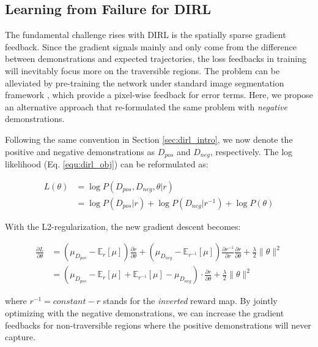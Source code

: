 \documentclass[../thesis.tex]{subfiles}
\begin{document}
\subsection{Learning from Failure for DIRL}
 
The fundamental challenge rises with DIRL is the spatially sparse gradient feedback.
Since the gradient signals mainly and only come from the difference between demonstrations and expected trajectories, the loss feedbacks in training will inevitably focus more on the traversible regions.
The problem can be alleviated by pre-training the network under standard image segmentation framework \cite{wulfmeier2016incorporating}, which provide a pixel-wise feedback for error terms.
Here, we propose an alternative approach that re-formulated the same problem with \textit{negative} demonstrations.
 
Following the same convention in Section \ref{sec:dirl_intro}, we now denote the positive and negative demonstrations as $D_{pos}$ and $D_{neg}$, respectively. The log likelihood (Eq. \ref{equ:dirl_obj}) can be reformulated as:
 
\begin{align}
L(\theta) &= \log P(D_{pos}, D_{neg},\theta|r) \\
&= \log P(D_{pos}|r) + \log P(D_{neg}|r^{-1}) + \log P(\theta)
\end{align}
 
With the L2-regularization, the new gradient descent becomes:
 
\begin{align}
\frac{\partial L}{\partial \theta} &= \left( \mu_{D_{pos}} - \mathbb{E}_{r}[\mu] \right) \frac{\partial r}{\partial \theta} + \left( \mu_{D_{neg}} - \mathbb{E}_{r^{-1}}[\mu] \right) \frac{\partial r^{-1}}{\partial r} \frac{\partial r}{\partial \theta} + \frac{\lambda}{2} \| \theta \|^2 \\
&= \left( \mu_{D_{pos}} - \mathbb{E}_{r}[\mu] + \mathbb{E}_{r^{-1}}[\mu] - \mu_{D_{neg}} \right) \cdot \frac{\partial r}{\partial \theta} + \frac{\lambda}{2} \| \theta \|^2
\end{align}
 
where $r^{-1} = constant - r $ stands for the \textit{inverted} reward map.
By jointly optimizing with the negative demonstrations, we can increase the gradient feedbacks for non-traversible regions where the positive demonstrations will never capture.
 
\end{document}
